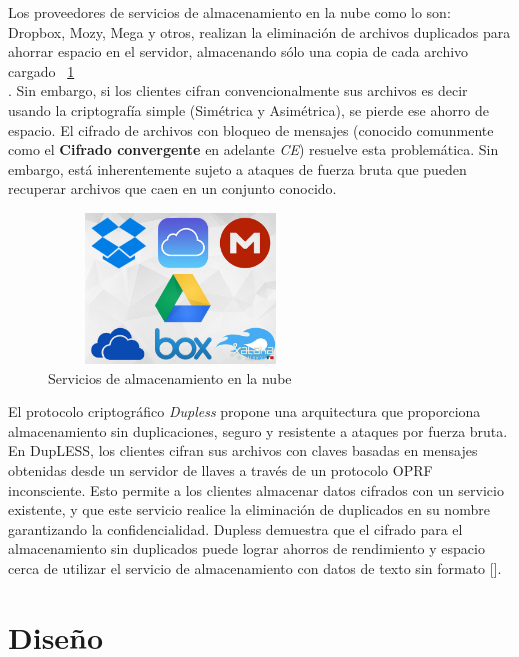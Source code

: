 Los proveedores de servicios de almacenamiento en la nube como lo son:  Dropbox, Mozy, Mega y otros, realizan la eliminación de archivos duplicados para ahorrar espacio en el servidor, almacenando sólo una copia de cada archivo cargado ~\ref{fig:4-0-1} \\
. Sin embargo, si los clientes cifran convencionalmente sus archivos es decir usando la criptografía simple (Simétrica y Asimétrica), se pierde ese ahorro de espacio. El cifrado de archivos con bloqueo de mensajes (conocido comunmente como el \textbf{Cifrado convergente} en adelante \textit{CE}) resuelve esta problemática. Sin embargo, está inherentemente sujeto a ataques de fuerza bruta que pueden recuperar archivos que caen en un conjunto conocido.\\


\begin{figure}[H]
\centering
	\includegraphics[width=7cm, height=4cm]{./images/servicios_nube.jpg}
	\caption{Servicios de almacenamiento en la nube}
	\label{fig:4-0-1}
\end{figure}

El protocolo criptográfico \textit{Dupless} propone una arquitectura que proporciona almacenamiento sin duplicaciones, seguro y resistente a ataques por fuerza bruta. En DupLESS, los clientes cifran sus archivos con claves basadas en mensajes obtenidas
desde un servidor de llaves a través de un protocolo OPRF inconsciente. Esto permite a los clientes almacenar datos cifrados con un servicio existente, y que este servicio realice la eliminación de duplicados en su nombre garantizando la confidencialidad. Dupless demuestra que el cifrado para el almacenamiento sin duplicados puede lograr ahorros de rendimiento y espacio cerca de utilizar el servicio de almacenamiento con datos de texto sin formato [].



\section{Diseño}


